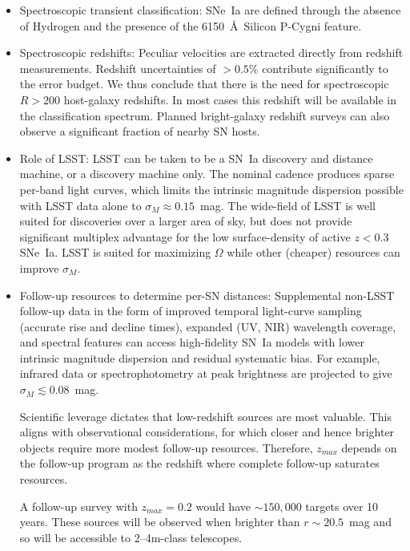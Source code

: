 \documentclass{aastex62}   	%
\begin{document}
\begin{itemize}
\item Spectroscopic transient classification:  SNe~Ia are defined through the absence of Hydrogen and the presence of the 6150~\AA~Silicon P-Cygni feature.
\item Spectroscopic redshifts:  Peculiar velocities are extracted directly from redshift measurements.  Redshift uncertainties of $>0.5$\% contribute significantly
to the error budget.  We thus conclude that there is the need for spectroscopic $R>200$ host-galaxy redshifts.  In most cases this redshift will be
available in the classification spectrum.  Planned bright-galaxy redshift surveys can also observe a significant fraction of nearby SN hosts.
\item Role of LSST:
LSST can be taken to be a SN~Ia discovery and distance machine, or a discovery machine only.   The nominal cadence  
 produces sparse per-band light curves, which limits the intrinsic magnitude dispersion possible with LSST data alone to $\sigma_M \approx 0.15$~mag.
The wide-field of LSST is
 well suited for discoveries over a larger area of sky, but does not provide significant multiplex advantage for the low surface-density of active
$z<0.3$ SNe~Ia.  LSST is  suited for maximizing $\Omega$ while other (cheaper) resources can improve $\sigma_M$.
\item Follow-up resources to determine per-SN distances:
Supplemental non-LSST follow-up data in the form of improved temporal light-curve sampling (accurate rise and decline times), 
expanded (UV, NIR) wavelength coverage, and spectral features
can access high-fidelity SN~Ia models with lower intrinsic magnitude dispersion and residual systematic bias.
For example, infrared data \citep{2012MNRAS.425.1007B} or spectrophotometry at peak brightness
 \citep{2015ApJ...815...58F} are projected to give $\sigma_M \lesssim 0.08$~mag.

Scientific leverage dictates that low-redshift sources are most valuable.
This aligns with observational considerations, for which closer and hence brighter objects require more modest follow-up resources.
Therefore, $z_{max}$ depends on the follow-up program as the redshift where complete follow-up saturates resources.

A follow-up survey with $z_{max}=0.2$ would have $\sim 150,000$ targets over 10 years.  These sources will be observed when
brighter than $r \sim 20.5$~mag and so will be accessible to 2--4m-class telescopes.  
\end{itemize}
\end{document}
